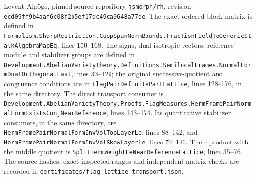 Levent Alp\"oge, pinned source repository
\texttt{jsmorph/rh}, revision
\texttt{ecd09ff9b4aaf6c08f2b5ef17dc49ca9648a77de}.
The exact ordered block matrix is defined in
\texttt{Formalism.SharpRestriction.\allowbreak CuspSpanNormBounds.\allowbreak FractionFieldToGenericStalkAlgebraMapEq},
lines 150--168.  The signs, dual isotropic vectors,
reference module and stabilizer groups are defined in
\texttt{Development.AbelianVarietyTheory.\allowbreak Definitions.SemilocalFrames.\allowbreak NormalFormDualOrthogonalLast},
lines 33--120; the original successive-quotient and congruence
conditions are in \texttt{FlagPairDefinitePartLattice},
lines 128--176, in the same directory.
The direct transport consumer is
\texttt{Development.AbelianVarietyTheory.\allowbreak Proofs.FlagMeasures.\allowbreak HermFramePairNormalFormExistsConjNearReference},
lines 143--174.  Its quantitative stabilizer consumers,
in the same directory, are
\texttt{HermFramePairNormalFormInvVolTopLayerLe},
lines 88--142, and
\texttt{HermFramePairNormalFormInvVolSkewLayerLe},
lines 74--126.  Their product with the middle quotient is
\texttt{SplitTermWeightLeNearReferenceLattice}, lines 35--76.
The source hashes, exact inspected ranges and independent
matrix checks are recorded in
\texttt{certificates/flag-lattice-transport.json}.
